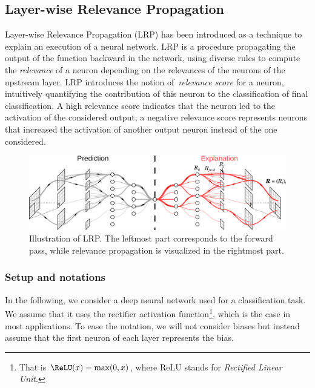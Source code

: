 \documentclass{../cs-classes/cs-classes}
\newcommand*{\1}{\digitsbb{1}}
\newcommand*{\0}{\digitsbb{0}}
\begin{document}
\subsection{Layer-wise Relevance Propagation}
Layer-wise Relevance Propagation (LRP) \cite{bach-2015} has been introduced as a technique to explain an execution of a neural network. LRP is a procedure propagating the output of the function backward in the network, using diverse rules to compute the \emph{relevance} of a neuron depending on the relevances of the neurons of the upstream layer. LRP introduces the notion of \emph{relevance score} for a neuron, intuitively quantifying the contribution of this neuron to the classification of final classification. A high relevance score indicates that the neuron led to the activation of the considered output; a negative relevance score represents neurons that increased the activation of another output neuron instead of the one considered.

\begin{figure}[H]
    \centering
    \includegraphics[width=.8\textwidth]{LRP.png}
    \caption{Illustration of LRP. The leftmost part corresponds to the forward pass, while relevance propagation is visualized in the rightmost part.}
\end{figure}

\subsubsection{Setup and notations}
In the following, we consider a deep neural network used for a classification task. We assume that it uses the rectifier activation function\footnote{That is $\ReLU(x)=\max(0, x)$, where ReLU stands for \emph{Rectified Linear Unit}.}, which is the case in most applications. To ease the notation, we will not consider biases but instead assume that the first neuron of each layer represents the bias. 
\end{document}
